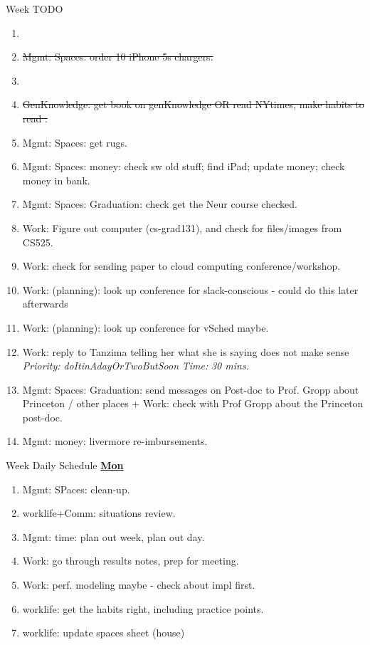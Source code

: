 \documentclass[serif, mathserif, final]{beamer}
\newcommand{\doneTask}[1]{\item \sout{#1}}
\newcommand{\timeEst}[1]{\textit{Time:} \textit{#1}}
\newcommand{\priority}[1]{\textit{Priority:} \textit{#1}}
\begin{document}
\begin{frame}{}
\begin{columns}
\begin{column}{0.50\linewidth}
\begin{block}{ Week TODO}
\begin{enumerate}
\item \tiny \doneTask{Mgmt: Spaces: order 10 iPhone 5s chargers.}
\item \tiny \doneTask{GenKnowledge: get book on genKnowledge OR read NYtimes, make habits to read .} 
\item \tiny Mgmt: Spaces: get rugs. 

\item \tiny Mgmt: Spaces: money: check sw old stuff; find iPad; update money; check money in bank. 
\item \tiny Mgmt: Spaces: Graduation: check get the Neur course checked. 

\item \tiny Work: Figure out computer (cs-grad131), and check for files/images from CS525. 



\item \tiny Work: check for sending paper to cloud computing conference/workshop. 
\item \tiny Work: (planning): look up conference for slack-conscious  - could do this later afterwards
\item \tiny Work: (planning): look up conference for vSched maybe. 
\item \tiny Work: reply to Tanzima telling her what she is saying does
  not make sense \priority{doItinAdayOrTwoButSoon} \timeEst{30 mins}.
\item \tiny Mgmt: Spaces: Graduation: send messages on Post-doc to
  Prof. Gropp about Princeton / other places + Work: check with Prof
  Gropp about the Princeton post-doc. 


\item \tiny Mgmt: money: livermore re-imbursements.

\end{enumerate}
\end{block} 


\begin{block}{Week Daily Schedule} 
\textbf{\small \underline{Mon}}
\begin{enumerate} 
\tiny \item \tiny Mgmt: SPaces: clean-up. 
\item \tiny worklife+Comm: situations review.
\item \tiny Mgmt: time: plan out week, plan out day.  
\item  \tiny Work: go through results notes, prep for meeting. 
\item \tiny Work: perf. modeling maybe - check about impl first. 
\item \tiny worklife: get the habits right, including practice points. 
\item \tiny worklife: update spaces sheet (house) 
 

\end{enumerate}
\end{block}
\end{column}
\end{columns}
\end{frame}
\end{document}
